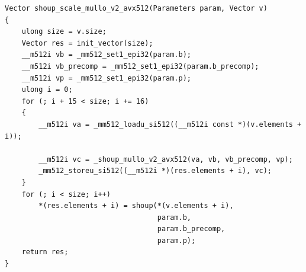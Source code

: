 \documentclass{article}
\begin{document}
\begin{lstlisting}[caption = Implementation of Shoup’s modular reduction (version 2 of multiply-low)]
Vector shoup_scale_mullo_v2_avx512(Parameters param, Vector v)
{
    ulong size = v.size;
    Vector res = init_vector(size);
    __m512i vb = _mm512_set1_epi32(param.b);
    __m512i vb_precomp = _mm512_set1_epi32(param.b_precomp);
    __m512i vp = _mm512_set1_epi32(param.p);
    ulong i = 0;
    for (; i + 15 < size; i += 16)
    {
        __m512i va = _mm512_loadu_si512((__m512i const *)(v.elements + i));

        __m512i vc = _shoup_mullo_v2_avx512(va, vb, vb_precomp, vp);
        _mm512_storeu_si512((__m512i *)(res.elements + i), vc);
    }
    for (; i < size; i++)
        *(res.elements + i) = shoup(*(v.elements + i),
                                    param.b,
                                    param.b_precomp,
                                    param.p);
    return res;
}
\end{lstlisting}


\newpage
\end{document}
